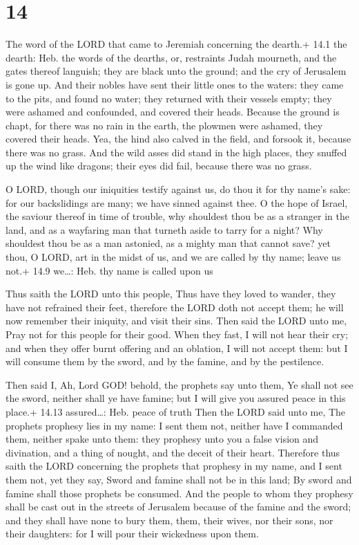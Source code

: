 \hypertarget{section-13}{%
\section{14}\label{section-13}}

 The word of the LORD that came to Jeremiah concerning the
dearth.+ 14.1 the dearth: Heb. the words of the dearths, or, restraints
 Judah mourneth, and the gates thereof languish; they are
black unto the ground; and the cry of Jerusalem is gone up. 
And their nobles have sent their little ones to the waters: they came to
the pits, and found no water; they returned with their vessels empty;
they were ashamed and confounded, and covered their heads. 
Because the ground is chapt, for there was no rain in the earth, the
plowmen were ashamed, they covered their heads.  Yea, the
hind also calved in the field, and forsook it, because there was no
grass.  And the wild asses did stand in the high places,
they snuffed up the wind like dragons; their eyes did fail, because
there was no grass.

 O LORD, though our iniquities testify against us, do thou
it for thy name's sake: for our backslidings are many; we have sinned
against thee.  O the hope of Israel, the saviour thereof in
time of trouble, why shouldest thou be as a stranger in the land, and as
a wayfaring man that turneth aside to tarry for a night? 
Why shouldest thou be as a man astonied, as a mighty man that cannot
save? yet thou, O LORD, art in the midst of us, and we are called by thy
name; leave us not.+ 14.9 we\ldots: Heb. thy name is called upon us

 Thus saith the LORD unto this people, Thus have they
loved to wander, they have not refrained their feet, therefore the LORD
doth not accept them; he will now remember their iniquity, and visit
their sins.  Then said the LORD unto me, Pray not for this
people for their good.  When they fast, I will not hear
their cry; and when they offer burnt offering and an oblation, I will
not accept them: but I will consume them by the sword, and by the
famine, and by the pestilence.

 Then said I, Ah, Lord GOD! behold, the prophets say unto
them, Ye shall not see the sword, neither shall ye have famine; but I
will give you assured peace in this place.+ 14.13 assured\ldots: Heb.
peace of truth  Then the LORD said unto me, The prophets
prophesy lies in my name: I sent them not, neither have I commanded
them, neither spake unto them: they prophesy unto you a false vision and
divination, and a thing of nought, and the deceit of their heart.
 Therefore thus saith the LORD concerning the prophets that
prophesy in my name, and I sent them not, yet they say, Sword and famine
shall not be in this land; By sword and famine shall those prophets be
consumed.  And the people to whom they prophesy shall be
cast out in the streets of Jerusalem because of the famine and the
sword; and they shall have none to bury them, them, their wives, nor
their sons, nor their daughters: for I will pour their wickedness upon
them.

